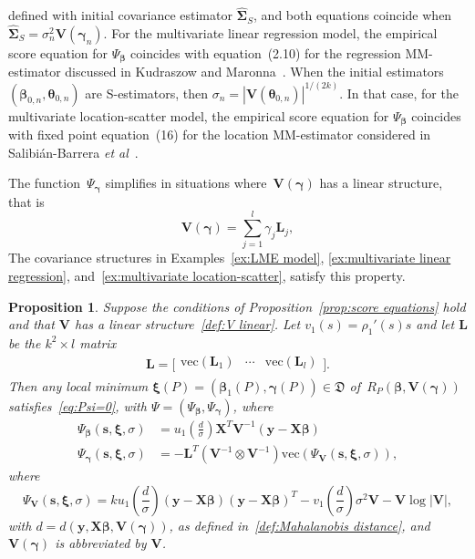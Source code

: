 \documentclass{article}
\numberwithin{equation}{section}
\theoremstyle{plain}
\newtheorem{proposition}{Proposition}
\newcommand{\vc}{\mathrm{vec}}
\newcommand{\bbeta}{\bm\beta}
\newcommand{\btheta}{\bm\theta}
\newcommand{\bxi}{\bm\xi}
\newcommand{\bgamma}{\bm\gamma}
\newcommand{\bSigma}{\mathbf{\Sigma}}
\newcommand{\by}{\mathbf{y}}
\newcommand{\bs}{\mathbf{s}}
\newcommand{\bX}{\mathbf{X}}
\newcommand{\bV}{\mathbf{V}}
\newcommand{\bL}{\mathbf{L}}
\begin{document}
defined with initial covariance estimator $\widehat{\bSigma}_S$, 
and both equations coincide when $\widehat{\bSigma}_S=\sigma_n^2\bV(\bgamma_n)$.
For the multivariate linear regression model, the empirical score equation for 
$\Psi_{\bbeta}$ coincides with equation~(2.10) for the regression MM-estimator 
discussed in Kudraszow and Maronna~\cite{kudraszow-maronna2011}. 
When the initial estimators $(\bbeta_{0,n},\btheta_{0,n})$ are S-estimators, then
$\sigma_n=|\bV(\btheta_{0,n})|^{1/(2k)}$.
In that case, for the multivariate location-scatter model,
the empirical score equation for $\Psi_{\bbeta}$ 
coincides with fixed point equation~(16) for the location MM-estimator 
considered in Salibi\'an-Barrera \textit{et al}~\cite{SalibianBarrera-VanAelst-Willems2006}.

The function~$\Psi_{\bgamma}$ simplifies in situations where~$\bV(\bgamma)$ has a linear structure, that is
\begin{equation}
\label{def:V linear}
\bV(\bgamma)=\sum_{j=1}^l\gamma_j\bL_j,
\end{equation}
The covariance structures in Examples~\ref{ex:LME model}, \ref{ex:multivariate linear regression}, and~\ref{ex:multivariate location-scatter},
satisfy this property.
\begin{proposition}
\label{prop:score equations linear}
Suppose the conditions of Proposition~\ref{prop:score equations} hold and that $\bV$
has a linear structure~\eqref{def:V linear}.
Let $v_1(s)=\rho_1'(s)s$ and let $\bL$ be the $k^2\times l$ matrix
\begin{equation}
\label{def:L}
\bL
=
\Big[
  \begin{array}{ccc}
    \vc\left(\bL_1\right)
 & \cdots &     \vc\left(\bL_l\right) \\
  \end{array}
\Big].
\end{equation}
Then any local minimum 
$\bxi(P)=(\bbeta_1(P),\bgamma(P))\in \mathfrak{D}$ of~$R_P(\bbeta,\bV(\bgamma))$
satisfies~\eqref{eq:Psi=0},
with $\Psi=(\Psi_{\bbeta},\Psi_{\bgamma})$, where
\begin{equation}
\label{def:Psi linear}
\begin{split}
\Psi_{\bbeta}(\bs,\bxi,\sigma)
&=
u_1\left(\frac{d}{\sigma}\right)
\bX^T\bV^{-1}(\by-\bX\bbeta)\\
\Psi_{\bgamma}(\bs,\bxi,\sigma)
&=
-\bL^T
\left(
\bV^{-1}
\otimes
\bV^{-1}
\right)
\vc\left(
\Psi_\bV(\bs,\bxi,\sigma)
\right),
\end{split}
\end{equation}
where 
\begin{equation}
\label{def:PsiV}
\Psi_\bV(\bs,\bxi,\sigma)
=
k
u_1\left(\frac{d}{\sigma}\right)
(\by-\bX\bbeta)(\by-\bX\bbeta)^T
-
v_1\left(\frac{d}{\sigma}\right)
\sigma^2\bV
-
\bV
\log|\bV|,
\end{equation}
with $d=d(\by,\bX\bbeta,\bV(\bgamma))$, as defined in~\eqref{def:Mahalanobis distance},
and $\bV(\bgamma)$ is abbreviated by $\bV$.
\end{proposition}
\end{document}
